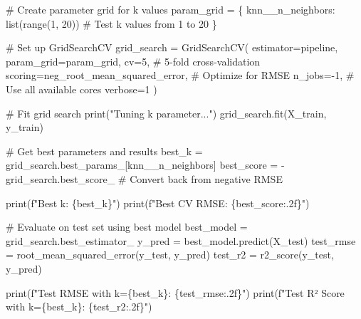 \documentclass[
  letterpaper,
  DIV=11,
  numbers=noendperiod]{scrreprt}
\newenvironment{Shaded}{\begin{snugshade}}{\end{snugshade}}
\newcommand{\BuiltInTok}[1]{\textcolor[rgb]{0.00,0.23,0.31}{#1}}
\newcommand{\CommentTok}[1]{\textcolor[rgb]{0.37,0.37,0.37}{#1}}
\newcommand{\DecValTok}[1]{\textcolor[rgb]{0.68,0.00,0.00}{#1}}
\newcommand{\NormalTok}[1]{\textcolor[rgb]{0.00,0.23,0.31}{#1}}
\newcommand{\OperatorTok}[1]{\textcolor[rgb]{0.37,0.37,0.37}{#1}}
\newcommand{\SpecialCharTok}[1]{\textcolor[rgb]{0.37,0.37,0.37}{#1}}
\newcommand{\SpecialStringTok}[1]{\textcolor[rgb]{0.13,0.47,0.30}{#1}}
\newcommand{\StringTok}[1]{\textcolor[rgb]{0.13,0.47,0.30}{#1}}
\begin{document}
\begin{Shaded}
\begin{Highlighting}[]
\CommentTok{\# Create parameter grid for k values}
\NormalTok{param\_grid }\OperatorTok{=}\NormalTok{ \{}
    \StringTok{\textquotesingle{}knn\_\_n\_neighbors\textquotesingle{}}\NormalTok{: }\BuiltInTok{list}\NormalTok{(}\BuiltInTok{range}\NormalTok{(}\DecValTok{1}\NormalTok{, }\DecValTok{20}\NormalTok{))  }\CommentTok{\# Test k values from 1 to 20}
\NormalTok{\}}

\CommentTok{\# Set up GridSearchCV}
\NormalTok{grid\_search }\OperatorTok{=}\NormalTok{ GridSearchCV(}
\NormalTok{    estimator}\OperatorTok{=}\NormalTok{pipeline,}
\NormalTok{    param\_grid}\OperatorTok{=}\NormalTok{param\_grid,}
\NormalTok{    cv}\OperatorTok{=}\DecValTok{5}\NormalTok{,  }\CommentTok{\# 5{-}fold cross{-}validation}
\NormalTok{    scoring}\OperatorTok{=}\StringTok{\textquotesingle{}neg\_root\_mean\_squared\_error\textquotesingle{}}\NormalTok{,  }\CommentTok{\# Optimize for RMSE}
\NormalTok{    n\_jobs}\OperatorTok{={-}}\DecValTok{1}\NormalTok{,  }\CommentTok{\# Use all available cores}
\NormalTok{    verbose}\OperatorTok{=}\DecValTok{1}
\NormalTok{)}

\CommentTok{\# Fit grid search}
\BuiltInTok{print}\NormalTok{(}\StringTok{"Tuning k parameter..."}\NormalTok{)}
\NormalTok{grid\_search.fit(X\_train, y\_train)}

\CommentTok{\# Get best parameters and results}
\NormalTok{best\_k }\OperatorTok{=}\NormalTok{ grid\_search.best\_params\_[}\StringTok{\textquotesingle{}knn\_\_n\_neighbors\textquotesingle{}}\NormalTok{]}
\NormalTok{best\_score }\OperatorTok{=} \OperatorTok{{-}}\NormalTok{grid\_search.best\_score\_  }\CommentTok{\# Convert back from negative RMSE}

\BuiltInTok{print}\NormalTok{(}\SpecialStringTok{f"Best k: }\SpecialCharTok{\{}\NormalTok{best\_k}\SpecialCharTok{\}}\SpecialStringTok{"}\NormalTok{)}
\BuiltInTok{print}\NormalTok{(}\SpecialStringTok{f"Best CV RMSE: }\SpecialCharTok{\{}\NormalTok{best\_score}\SpecialCharTok{:.2f\}}\SpecialStringTok{"}\NormalTok{)}

\CommentTok{\# Evaluate on test set using best model}
\NormalTok{best\_model }\OperatorTok{=}\NormalTok{ grid\_search.best\_estimator\_}
\NormalTok{y\_pred }\OperatorTok{=}\NormalTok{ best\_model.predict(X\_test)}
\NormalTok{test\_rmse }\OperatorTok{=}\NormalTok{ root\_mean\_squared\_error(y\_test, y\_pred)}
\NormalTok{test\_r2 }\OperatorTok{=}\NormalTok{ r2\_score(y\_test, y\_pred)}

\BuiltInTok{print}\NormalTok{(}\SpecialStringTok{f"Test RMSE with k=}\SpecialCharTok{\{}\NormalTok{best\_k}\SpecialCharTok{\}}\SpecialStringTok{: }\SpecialCharTok{\{}\NormalTok{test\_rmse}\SpecialCharTok{:.2f\}}\SpecialStringTok{"}\NormalTok{)}
\BuiltInTok{print}\NormalTok{(}\SpecialStringTok{f"Test R² Score with k=}\SpecialCharTok{\{}\NormalTok{best\_k}\SpecialCharTok{\}}\SpecialStringTok{: }\SpecialCharTok{\{}\NormalTok{test\_r2}\SpecialCharTok{:.2f\}}\SpecialStringTok{"}\NormalTok{)}
\end{Highlighting}
\end{Shaded}
\end{document}
